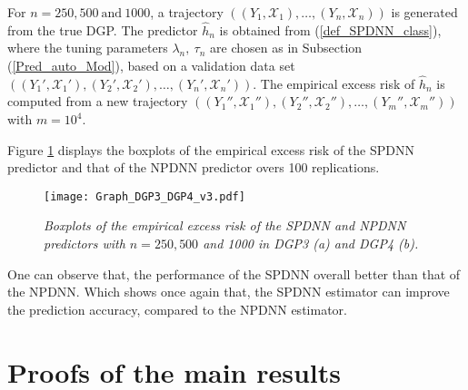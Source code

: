 \documentclass[10pt,twoside]{article}
\numberwithin{equation}{section}
\begin{document}
\medskip

For $n=250, 500 ~ \text{and}~ 1000$, a trajectory $((Y_1, \mathcal{X}_1), \ldots, (Y_n, \mathcal{X}_n))$  is generated from the true DGP. The predictor $\widehat{h}_n$ is obtained from (\ref{def_SPDNN_class}), where the tuning parameters $\lambda_n, ~ \tau_n$ are chosen as in Subsection (\ref{Pred_auto_Mod}), based on a validation data set $ ((Y_1', \mathcal{X}_1'), (Y_2', \mathcal{X}_2'), \ldots, (Y_n', \mathcal{X}_n')) $.
%
The empirical excess risk of $\widehat{h}_n$ is computed from a new trajectory $ ((Y_1'', \mathcal{X}_1''), (Y_2'', \mathcal{X}_2''), \ldots, (Y_m'', \mathcal{X}_m'')) $ with $m=10^4$.

\medskip

Figure \ref{Graph_DGP3_DGP4} displays  the boxplots of the empirical excess risk of the SPDNN predictor and that of the NPDNN predictor overs 100 replications.
%
%
\begin{figure}[h!]
\begin{center}
\texttt{[image: Graph\_DGP3\_DGP4\_v3.pdf]}
\end{center}
\vspace{-.7cm}
\caption{\it Boxplots of the empirical  excess risk  of the SPDNN and NPDNN predictors with $n=250, 500$ and 1000 in DGP3 (a) and DGP4 (b).}
\label{Graph_DGP3_DGP4}
\end{figure}
% 
%
One can observe that, the performance of the SPDNN overall better than that of the NPDNN. Which shows once again that, the SPDNN estimator can improve the prediction accuracy, compared to the NPDNN estimator.

 

\section{Proofs of the main results}\label{prove}
\end{document}

